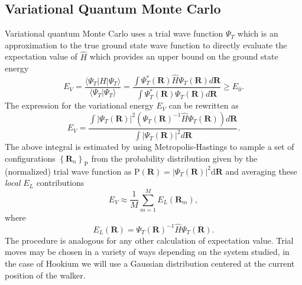 \documentclass[final,3p,times,twocolumn]{elsarticle}
\begin{document}
	\subsection{Variational Quantum Monte Carlo}
	Variational quantum Monte Carlo uses a trial wave function $\Psi_{T}$ which is an approximation to the true ground state wave function to directly evaluate the expectation value of $\hat H$ which provides an upper bound on the ground state energy
	\begin{equation}
		\label{eq:variational_princ}
		E_{V}=\frac{\langle \Psi_{T} | H | \Psi_{T} \rangle}{\langle \Psi_{T} | \Psi_{T} \rangle}
		=\frac{\int \Psi_{T}^{*}(\mathbf{R}) \hat{H} \Psi_{T}(\mathbf{R}) d \mathbf{R}}{\int \Psi_{T}^{*}(\mathbf{R}) \Psi_{T}(\mathbf{R}) d \mathbf{R}} \geq E_{0}.
	\end{equation}
	The expression for the variational energy $E_V$ can be rewritten as
	\begin{equation}
		\label{eq:E_V}
		E_{V}=\frac{\int\left|\Psi_{T}(\mathbf{R})\right|^{2}\left(\Psi_{T}(\mathbf{R})^{-1} \hat{H} \Psi_{T}(\mathbf{R})\right) d \mathbf{R}}{\int\left|\Psi_{T}(\mathbf{R})\right|^{2} d \mathbf{R}}.
	\end{equation}
	The above integral is estimated by using Metropolis-Hastings to sample a set of configurations $\left\{ \mathbf{R}_n \right\}_{\mathrm{P}}$ from the probability distribution given by the (normalized) trial wave function as $\mathrm{P}(\mathbf{R}) = |\Psi_T(\mathbf{R})|^2 \mathrm{d}\mathbf{R}$ and averaging these \emph{local} $E_L$ contributions
	\begin{equation}
		E_{V} \approx \frac{1}{M} \sum_{m=1}^{M} E_{L}\left(\mathbf{R}_{m}\right),
	\end{equation}
	where
	\begin{equation}
		E_{L}(\mathbf{R})=\Psi_{T}(\mathbf{R})^{-1} \hat{H} \Psi_{T}(\mathbf{R}).
	\end{equation}
	The procedure is analogous for any other calculation of expectation value. Trial moves may be chosen in a variety of ways depending on the system studied, in the case of Hookium we will use a Gaussian distribution centered at the current position of the walker.
	
\end{document}
